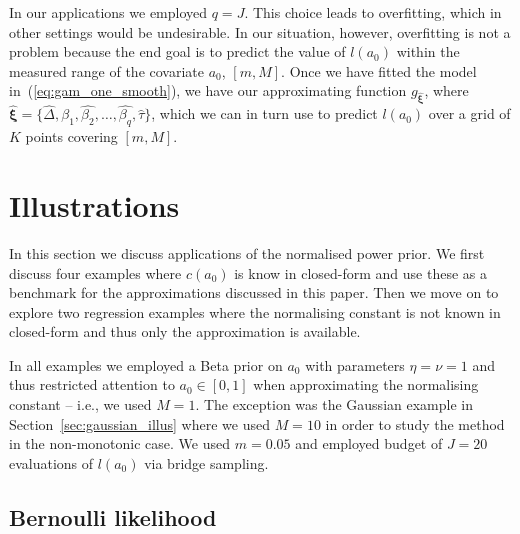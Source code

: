 \documentclass[a4paper, notitlepage, 11pt]{article}
\begin{document}
In our applications we employed $q = J$.
This choice leads to overfitting, which in other settings would be undesirable.
In our situation, however, overfitting is not a problem because the end goal is to predict the value of $l(a_0)$ within the measured range of the covariate $a_0$, $[m, M]$.
Once we have fitted the model in~(\ref{eq:gam_one_smooth}), we have our approximating function $g_{\boldsymbol{\hat{\xi}}}$, where $\boldsymbol{\hat{\xi}} = \{ \hat{\Delta}, \hat{\beta_1}, \hat{\beta_2}, \ldots, \hat{\beta_q}, \hat{\tau}\}$, which we can in turn use to predict $l(a_0)$ over a grid of $K$ points covering  $[m, M]$.

\section{Illustrations}
\label{sec:illustrations}

In this section we discuss applications of the normalised power prior.
We first discuss four examples where $c(a_0)$ is know in closed-form and use these as a benchmark for the approximations discussed in this paper.
Then we move on to explore two regression examples where the normalising constant is not known in closed-form and thus only the approximation is available.  

In all examples we employed a Beta prior on $a_0$ with parameters $\eta = \nu = 1$ and thus restricted attention to $a_0 \in [0, 1]$ when approximating the normalising constant -- i.e., we used $M = 1$.
The exception was the Gaussian example in Section~\ref{sec:gaussian_illus} where we used $M=10$ in order to study the method in the non-monotonic case.
We used $m = 0.05$ and employed budget of $J = 20$ evaluations of $l(a_0)$ via bridge sampling.   

\subsection{Bernoulli likelihood}
\label{sec:reproduce_N2009}
\end{document}
